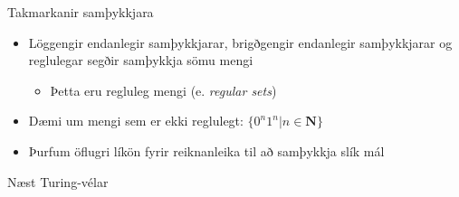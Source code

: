 \documentclass[handout]{beamer}
\begin{document}
\begin{frame}{Takmarkanir samþykkjara}
    \begin{itemize}
        \item Löggengir endanlegir samþykkjarar, brigðgengir endanlegir samþykkjarar og reglulegar segðir samþykkja sömu mengi
        \begin{itemize}
            \item Þetta eru regluleg mengi (e. \emph{regular sets})
        \end{itemize}
        \item Dæmi um mengi sem er ekki reglulegt: $\{0^n1^n| n\in \mathbf{N}\}$
        \item Þurfum öflugri líkön fyrir reiknanleika til að samþykkja slík mál
    \end{itemize}
\end{frame}

\begin{frame}{Næst}
Turing-vélar
\end{frame}
\end{document}
